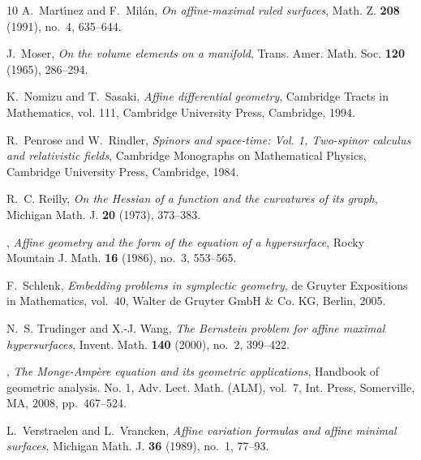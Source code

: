 \documentclass [leqno, 10pt]{amsart}
\theoremstyle{definition}
\numberwithin{equation}{section}
\begin{document}
\begin{thebibliography}{10}
A.~Mart{\'{\i}}nez and F.~Mil{\'a}n, \emph{On affine-maximal ruled surfaces},
  Math. Z. \textbf{208} (1991), no.~4, 635--644.

J.~Moser, \emph{On the volume elements on a manifold}, Trans. Amer. Math. Soc.
  \textbf{120} (1965), 286--294.

K.~Nomizu and T.~Sasaki, \emph{Affine differential geometry}, Cambridge Tracts
  in Mathematics, vol. 111, Cambridge University Press, Cambridge, 1994.

R.~Penrose and W.~Rindler, \emph{Spinors and space-time: {V}ol. 1, {T}wo-spinor
  calculus and relativistic fields}, Cambridge Monographs on Mathematical
  Physics, Cambridge University Press, Cambridge, 1984.

R.~C. Reilly, \emph{On the {H}essian of a function and the curvatures of its
  graph}, Michigan Math. J. \textbf{20} (1973), 373--383.

\bysame, \emph{Affine geometry and the form of the equation of a hypersurface},
  Rocky Mountain J. Math. \textbf{16} (1986), no.~3, 553--565.

F.~Schlenk, \emph{Embedding problems in symplectic geometry}, de Gruyter
  Expositions in Mathematics, vol.~40, Walter de Gruyter GmbH \& Co. KG,
  Berlin, 2005.

N.~S. Trudinger and X.-J. Wang, \emph{The {B}ernstein problem for affine
  maximal hypersurfaces}, Invent. Math. \textbf{140} (2000), no.~2, 399--422.

\bysame, \emph{The {M}onge-{A}mp\`ere equation and its geometric applications},
  Handbook of geometric analysis. {N}o. 1, Adv. Lect. Math. (ALM), vol.~7, Int.
  Press, Somerville, MA, 2008, pp.~467--524.

L.~Verstraelen and L.~Vrancken, \emph{Affine variation formulas and affine
  minimal surfaces}, Michigan Math. J. \textbf{36} (1989), no.~1, 77--93.

\end{thebibliography}
\end{document}
